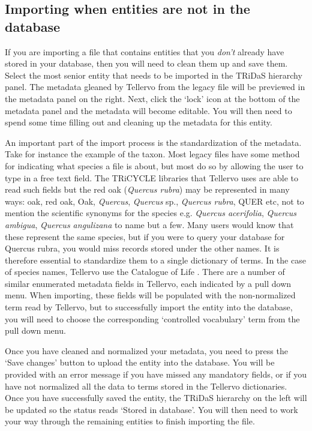\subsection{Importing when entities are not in the database}
If you are importing a file that contains entities that you \emph{don't} already have stored in your database, then you will need to clean them up and save them.   Select the most senior entity that needs to be imported in the TRiDaS hierarchy panel.  The metadata gleaned by Tellervo from the legacy file will be previewed in the metadata panel on the right.  Next, click the `lock' icon at the bottom of the metadata panel and the metadata will become editable.  You will then need to spend some time filling out and cleaning up the metadata for this entity.  

An important part of the import process is the standardization of the metadata.  Take for instance the example of the taxon.  Most legacy files have some method for indicating what species a file is about, but most do so by allowing the user to type in a free text field.  The TRiCYCLE libraries that Tellervo uses are able to read such fields but the red oak (\textit{Quercus rubra}) may be represented in many ways: oak, red oak, Oak, \textit{Quercus}, \textit{Quercus} sp., \textit{Quercus rubra}, QUER etc, not to mention the scientific synonyms for the species e.g. \textit{Quercus acerifolia}, \textit{Quercus ambigua}, \textit{Quercus angulizana} to name but a few.  Many users would know that these represent the same species, but if you were to query your database for Quercus rubra, you would miss records stored under the other names.  It is therefore essential to standardize them to a single dictionary of terms.  In the case of species names, Tellervo use the Catalogue of Life \citep{col}.  There are a number of similar enumerated metadata fields in Tellervo, each indicated by a pull down menu.  When importing, these fields will be populated with the non-normalized term read by Tellervo, but to successfully import the entity into the database, you will need to choose the corresponding `controlled vocabulary' term from the pull down menu.  

Once you have cleaned and normalized your metadata, you need to press the `Save changes' button to upload the entity into the database.  You will be provided with an error message if you have missed any mandatory fields, or if you have not normalized all the data to terms stored in the Tellervo dictionaries.  Once you have successfully saved the entity, the TRiDaS hierarchy on the left will be updated so the status reads `Stored in database'.  You will then need to work your way through the remaining entities to finish importing the file.

